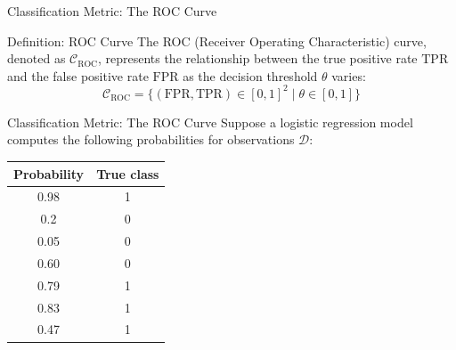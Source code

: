 \begin{frame}{Classification Metric: The ROC Curve}
	\begin{block}{Definition: ROC Curve}
		The ROC (Receiver Operating Characteristic) curve, denoted as $\mathcal{C}_{\text{ROC}}$, represents the relationship between the true positive rate $\text{TPR}$ and the false positive rate $\text{FPR}$ as the decision threshold $\theta$ varies:
		\begin{equation*}
			\mathcal{C}_{\text{ROC}} = \{ \left(\text{FPR}, \text{TPR}\right) \in [0, 1]^2 \mid \theta \in [0, 1]\}
		\end{equation*}
	\end{block}
\end{frame}

\begin{frame}{Classification Metric: The ROC Curve}
	Suppose a logistic regression model computes the following probabilities for observations $\mathcal{D}$:
	\begin{table}
		\centering
		\begin{tabular}{|c|c|}
			\hline
			\textbf{Probability} & \textbf{True class} \\ \hline
			0.98 & 1 \\ \hline
			0.2  & 0 \\ \hline
			0.05 & 0 \\ \hline
			0.60 & 0 \\ \hline
			0.79 & 1 \\ \hline
			0.83 & 1 \\ \hline
			0.47 & 1 \\ \hline
		\end{tabular}
	\end{table}
\end{frame}


